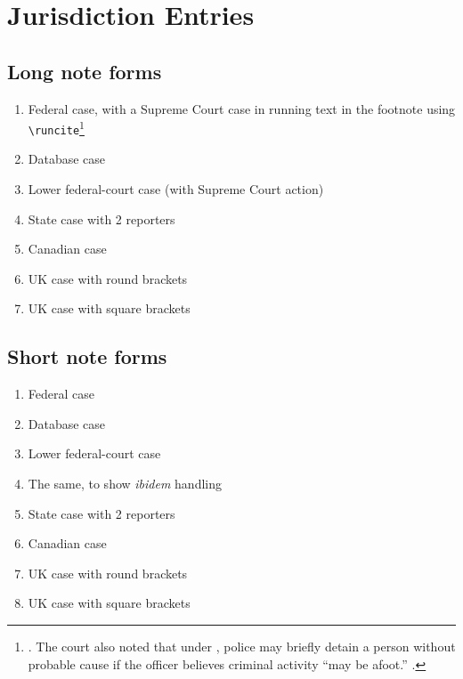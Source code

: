 \documentclass[a4paper,12pt]{article}
\begin{document}
\section*{Jurisdiction Entries}
\label{juris}

\subsection*{Long note forms}
\label{sec:long}
\begin{enumerate}\setlength{\parskip}{-4pt}
\item Federal case, with a Supreme Court case in running text in the
  footnote using \verb+\runcite+\footnote{\cite[145]{federal:case}.
    The court also noted that under
    , police may briefly detain a
    person without probable cause if the officer believes criminal
    activity \enquote{may be afoot.}  \cite[143]{federal:case}.}
\item Database case\autocite{database:case}
\item Lower federal-court case (with Supreme Court
  action)\autocite{federal:lower:related}
\item State case with 2 reporters\autocite{state:case:2reps}
\item Canadian case\autocite{canada:case}
\item UK case with round brackets\autocite{uk:case:round}
\item UK case with square brackets\autocite{uk:case:square}
\end{enumerate}

\subsection*{Short note forms}
\label{sec:short}
\begin{enumerate}\setlength{\parskip}{-4pt}
\setcounter{enumi}{7}
\item Federal case\autocite[145]{federal:case}
\item Database case\autocite[3]{database:case}
\item Lower federal-court case\autocite[215]{federal:lower:related}
\item The same, to show \emph{ibidem}
  handling\autocite[212]{federal:lower:related}
\item State case with 2 reporters\autocite{state:case:2reps}
\item Canadian case\autocite{canada:case}
\item UK case with round brackets\autocite{uk:case:round}
\item UK case with square brackets\autocite{uk:case:square}
\end{enumerate}
\end{document}
